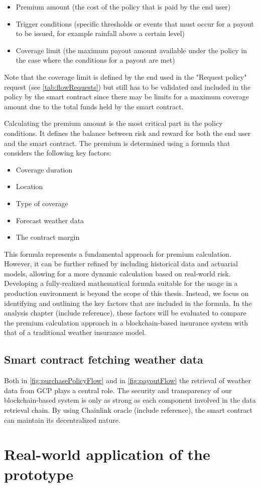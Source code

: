 \begin{itemize}
    \item Premium amount (the cost of the policy that is paid by the end user)
    \item Trigger conditions (specific thresholds or events that must occur for a payout to be issued, for example rainfall above a certain level)
    \item Coverage limit (the maximum payout amount available under the policy in the case where the conditions for a payout are met)
\end{itemize}

Note that the coverage limit is defined by the end used in the "Request policy" request (see \cref{tab:flowRequests}) but still has to be validated and included in the policy by the smart contract since there may be limits for a maximum coverage amount due to the total funds held by the smart contract.

Calculating the premium amount is the most critical part in the policy conditions. It defines the balance between risk and reward for both the end user and the smart contract. The premium is determined using a formula that considers the following key factors:

\begin{itemize}
    \item Coverage duration
    \item Location
    \item Type of coverage
    \item Forecast weather data
    \item The contract margin
\end{itemize}

This formula represents a fundamental approach for premium calculation. However, it can be further refined by including historical data and actuarial models, allowing for a more dynamic calculation based on real-world risk. Developing a fully-realized mathematical formula suitable for the usage in a production environment is beyond the scope of this thesis. Instead, we focus on identifying and outlining the key factors that are included in the formula. In the analysis chapter (include reference), these factors will be evaluated to compare the premium calculation approach in a blockchain-based insurance system with that of a traditional weather insurance model.

\subsection{Smart contract fetching weather data}

Both in \cref{fig:purchasePolicyFlow} and in \cref{fig:payoutFlow} the retrieval of weather data from GCP plays a central role. The security and transparency of our blockchain-based system is only as strong as each component involved in the data retrieval chain. By using Chainlink oracle (include reference), the smart contract can maintain its decentralized nature. 


\section{Real-world application of the prototype}\label{section:real_world_application_prototype}